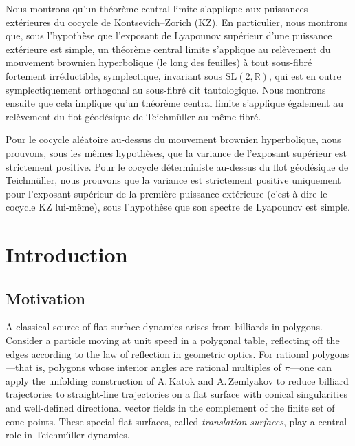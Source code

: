 \documentclass[JEP,XML,SOM,Unicode,published]{cedram}
\theoremstyle{plain}
\theoremstyle{definition}
\numberwithin{equation}{subsection}
\begin{document}



\begin{altabstract}
Nous montrons qu’un théorème central limite s’applique aux puissances extérieures du cocycle de Kontsevich–Zorich (KZ). En particulier, nous montrons que, sous l’hypothèse que l’exposant de Lyapounov supérieur d'une puissance extérieure est simple, un théorème central limite s’applique au relèvement du mouvement brownien hyperbolique (le long des feuilles) à tout sous-fibré fortement irréductible, symplectique, invariant sous $\mathrm{SL}(2,\mathbb R)$, qui est en outre symplectiquement orthogonal au sous-fibré dit tautologique. Nous montrons ensuite que cela implique qu’un théorème central limite s’applique également au relèvement du flot géodésique de Teichmüller au même fibré.

Pour le cocycle aléatoire au-dessus du mouvement brownien hyperbolique, nous prouvons, sous les mêmes hypothèses, que la variance de l’exposant supérieur est strictement positive. Pour le cocycle déterministe au-dessus du flot géodésique de Teichmüller, nous prouvons que la variance est strictement positive uniquement pour l’exposant supérieur de la première puissance extérieure (c’est-à-dire le cocycle KZ lui-même), sous l’hypothèse que son spectre de Lyapounov est simple.
\end{altabstract}

\maketitle

\tableofcontents


\vspace*{-2.5\baselineskip}\vskip0pt\enlargethispage{.5\baselineskip}%
\section{Introduction}

\subsection{Motivation} A classical source of flat surface dynamics arises from billiards in polygons. Consider a particle moving at unit speed in a polygonal table, reflecting off the edges according to the law of reflection in geometric optics. For rational polygons—that is, polygons whose interior angles are rational multiples of $\pi$—one can apply the unfolding construction of A.\,Katok and A.\,Zemlyakov \cite{ZK75} to reduce billiard trajectories to straight-line trajectories on a flat surface with conical singularities and well-defined directional vector fields in the complement of the finite set of cone points. These special flat surfaces, called \emph{translation surfaces}, play a central role in Teichmüller dynamics.
\end{document}

